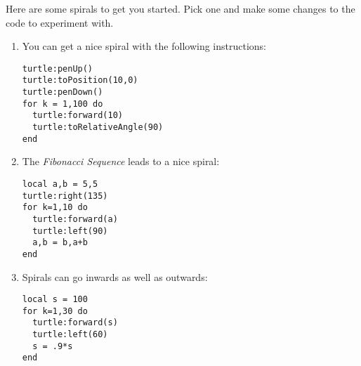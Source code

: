 \documentclass[
  xhtml,%
  use filename%
]{internet}
\begin{document}
Here are some spirals to get you started.
Pick one and make some changes to the code to experiment with.

\begin{enumerate}

\item You can get a nice spiral with the following instructions:

\begin{verbatim}
turtle:penUp()
turtle:toPosition(10,0)
turtle:penDown()
for k = 1,100 do
  turtle:forward(10)
  turtle:toRelativeAngle(90)
end
\end{verbatim}

\item The \emph{Fibonacci Sequence} leads to a nice spiral:

\begin{verbatim}
local a,b = 5,5
turtle:right(135)
for k=1,10 do
  turtle:forward(a)
  turtle:left(90)
  a,b = b,a+b
end
\end{verbatim}

\item Spirals can go inwards as well as outwards:

\begin{verbatim}
local s = 100
for k=1,30 do
  turtle:forward(s)
  turtle:left(60)
  s = .9*s
end
\end{verbatim}
\end{enumerate}
\end{document}
